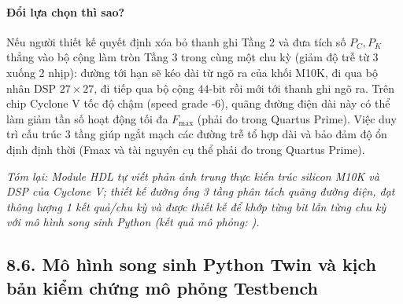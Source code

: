 \paragraph{Đổi lựa chọn thì sao?}
Nếu người thiết kế quyết định xóa bỏ thanh ghi Tầng 2 và đưa tích số $P_C, P_K$ thẳng vào bộ cộng làm tròn Tầng 3 trong cùng một chu kỳ (giảm độ trễ từ 3 xuống 2 nhịp): đường tới hạn sẽ kéo dài từ ngõ ra của khối M10K, đi qua bộ nhân DSP $27 \times 27$, đi tiếp qua bộ cộng $44\text{-bit}$ rồi mới tới thanh ghi ngõ ra. Trên chip Cyclone V tốc độ chậm (speed grade -6), quãng đường điện dài này có thể làm giảm tần số hoạt động tối đa $F_{\max}$ (phải đo trong Quartus Prime). Việc duy trì cấu trúc 3 tầng giúp ngắt mạch các đường trễ tổ hợp dài và bảo đảm độ ổn định định thời (Fmax và tài nguyên cụ thể phải đo trong Quartus Prime).

\textit{Tóm lại: Module HDL tự viết phản ánh trung thực kiến trúc silicon M10K và DSP của Cyclone V; thiết kế đường ống 3 tầng phân tách quãng đường điện, đạt thông lượng 1 kết quả/chu kỳ và được thiết kế để khớp từng bit lẫn từng chu kỳ với mô hình song sinh Python (kết quả mô phỏng: ).}

\subsection*{8.6. Mô hình song sinh Python Twin và kịch bản kiểm chứng mô phỏng Testbench}

